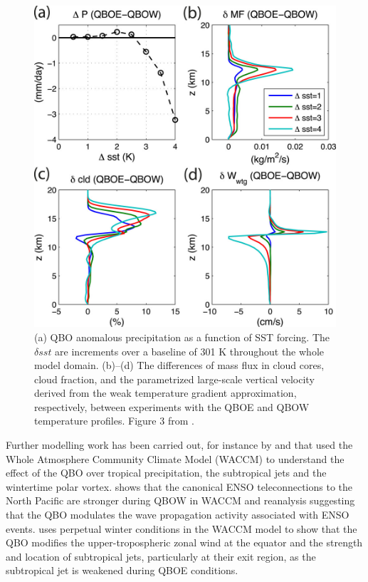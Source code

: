 \begin{figure}[t!]
\centering
\includegraphics[width=0.85\linewidth]{figures/nie_sobel}
\caption[The non-linear relationship of the QBO with SST forcings]{(a) QBO anomalous precipitation as a function of SST forcing. The $\delta sst$ are increments over a baseline of 301 K throughout the whole model domain. (b)–(d) The differences of mass flux in cloud cores, cloud fraction, and the parametrized large-scale vertical velocity derived from the weak temperature gradient approximation, respectively, between experiments with the QBOE and QBOW temperature profiles. Figure 3 from \cite{nie2015}. }
\label{fig:nie}
\end{figure}  

Further modelling work has been carried out, for instance by \cite{garfinkel2010} and \cite{garfinkel2011} that used the Whole Atmosphere Community Climate Model (WACCM) to understand the effect of the QBO over tropical precipitation, the subtropical jets and the wintertime polar vortex. \cite{garfinkel2010} shows that the canonical ENSO teleconnections to the North Pacific are stronger during QBOW in WACCM and reanalysis suggesting that the QBO modulates the wave propagation activity associated with ENSO events.
 \cite{garfinkel2011} uses perpetual winter conditions in the WACCM model to show that the QBO modifies the upper-tropospheric zonal wind at the equator and the strength and location of subtropical jets, particularly at their exit region, as the subtropical jet is weakened during QBOE conditions.

